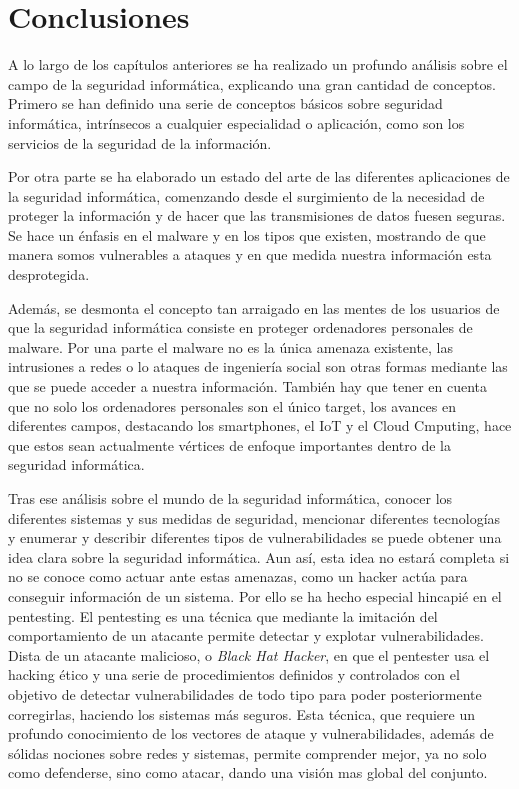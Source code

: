\chapter{Conclusiones}

A lo largo de los capítulos anteriores se ha realizado un profundo análisis sobre el campo de la seguridad informática, explicando una gran cantidad de conceptos. Primero se han definido una serie de conceptos básicos sobre seguridad informática, intrínsecos a cualquier especialidad o aplicación, como son los servicios de la seguridad de la información.

Por otra parte se ha elaborado un estado del arte de las diferentes aplicaciones de la seguridad informática, comenzando desde el surgimiento de la necesidad de proteger la información y de hacer que las transmisiones de datos fuesen seguras. Se hace un énfasis en el malware y en los tipos que existen, mostrando de que manera somos vulnerables a ataques y en que medida nuestra información esta desprotegida. 

Además, se desmonta el concepto tan arraigado en las mentes de los usuarios de que la seguridad informática consiste en proteger ordenadores personales de malware. Por una parte el malware no es la única amenaza existente, las intrusiones a redes o lo ataques de ingeniería social son otras formas mediante las que se puede acceder a nuestra información. También hay que tener en cuenta que no solo los ordenadores personales son el único target, los avances en diferentes campos, destacando los smartphones, el IoT y el Cloud Cmputing, hace que estos sean actualmente vértices de enfoque importantes dentro de la seguridad informática.

Tras ese análisis sobre el mundo de la seguridad informática, conocer los diferentes sistemas y sus medidas de seguridad, mencionar diferentes tecnologías y enumerar y describir diferentes tipos de vulnerabilidades se puede obtener una idea clara sobre la seguridad informática. Aun así, esta idea no estará completa si no se conoce como actuar ante estas amenazas, como un hacker actúa para conseguir información de un sistema. Por ello se ha hecho especial hincapié en el pentesting. El pentesting es una técnica que mediante la imitación del comportamiento de un atacante permite detectar y explotar vulnerabilidades. Dista de un atacante malicioso, o \textit{Black Hat Hacker}, en que el pentester usa el hacking ético y una serie de procedimientos definidos y controlados con el objetivo de detectar vulnerabilidades de todo tipo para poder posteriormente corregirlas, haciendo los sistemas más seguros. Esta técnica, que requiere un profundo conocimiento de los vectores de ataque y vulnerabilidades, además de sólidas nociones sobre redes y sistemas, permite comprender mejor, ya no solo como defenderse, sino como atacar, dando una visión mas global del conjunto.


